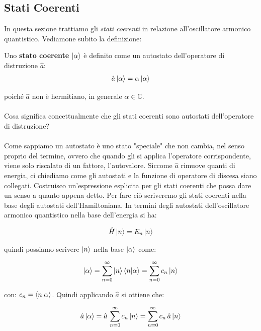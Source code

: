 \subsection{Stati Coerenti}

	In questa sezione trattiamo gli \textit{stati coerenti} in relazione all'oscillatore armonico quantistico. Vediamone subito la definizione:
	
\begin{mydef}
	Uno \textbf{stato coerente} $\ket{\alpha}$ è definito come un autostato dell'operatore di distruzione $\hat{a}$:
\begin{align*}
	\hat{a}\ket{\alpha} = \alpha \ket{\alpha}
\end{align*}
\end{mydef}

	poiché $\hat{a}$ non è hermitiano, in generale $\alpha \in \mathbb{C}$. 
	\\
	\\
	Cosa significa concettualmente che gli stati coerenti sono autostati dell'operatore di distruzione?
	\\
	\\
	Come sappiamo un autostato è uno stato "speciale" che non cambia, nel senso proprio del termine, ovvero che quando gli si applica l'operatore corrispondente, viene solo riscalato di un fattore, l'autovalore. Siccome $\hat{a}$ rimuove quanti di energia, ci chiediamo come gli autostati e la funzione di operatore di discesa siano collegati. Costruisco un'espressione esplicita per gli stati coerenti che possa dare un senso a quanto appena detto. Per fare ciò scriveremo gli stati coerenti nella base degli autostati dell'Hamiltoniana. In termini degli autostati dell'oscillatore armonico quantistico nella base dell'energia si ha:
	
\begin{align*}
	\hat{H} \ket{n} = E_n \ket{n} 
\end{align*}
	
	quindi possiamo scrivere $\ket{n}$ nella base $\ket{\alpha}$ come:
	
\begin{align*}
	\ket{\alpha} = \sum_{n = 0}^{\infty} \ket{n} \braket{n}{\alpha} = \sum_{n=0}^{\infty} c_n \ket{n}
\end{align*}
	
	con: $c_n = \braket{n}{\alpha}$. Quindi applicando $\hat{a}$ si ottiene che:
	
\begin{align*}
	\hat{a} \ket{\alpha} = \hat{a} \, \sum_{n = 0}^{\infty} c_n \ket{n} = \sum_{n=0}^{\infty} c_n \, \hat{a} \ket{n}
\end{align*}
	
